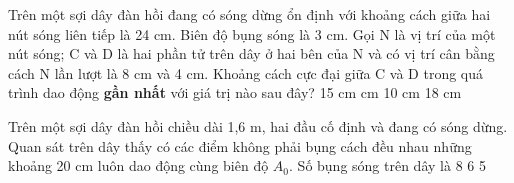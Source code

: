 \begin{ex}%
Trên một sợi dây đàn hồi đang có sóng dừng ổn định với khoảng cách giữa hai nút sóng liên tiếp là 24 cm. Biên độ bụng sóng là 3 cm. Gọi N là vị trí của một nút sóng; C và D là hai phần tử trên dây ở hai bên của N và có vị trí cân bằng cách N lần lượt là 8 cm và 4 cm. Khoảng cách cực đại giữa C và D trong quá trình dao động \textbf{gần nhất} với giá trị nào sau đây?
\choice
{15 cm}
{ cm}
{10 cm}
{18 cm}
\end{ex} 
\begin{ex}%
Trên một sợi dây đàn hồi chiều dài 1,6 m, hai đầu cố định và đang có sóng dừng. Quan sát trên dây thấy có các điểm không phải bụng cách đều nhau những khoảng 20 cm luôn dao động cùng biên độ $A_0$. Số bụng sóng trên dây là
\choice
{}
{8}
{6}
{5}
\end{ex} 


